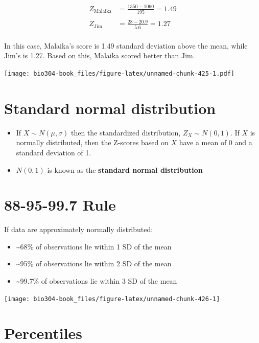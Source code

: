 \documentclass[]{book}
\providecommand{\tightlist}{%
  \setlength{\itemsep}{0pt}\setlength{\parskip}{0pt}}
\theoremstyle{definition}
\theoremstyle{definition}
\theoremstyle{definition}
\theoremstyle{remark}
\begin{document}
\begin{align}
Z_\text{Malaika} &= \frac{1350 - 1060}{195} = 1.49\\
\\
Z_\text{Jim} &= \frac{28 - 20.9}{5.6} = 1.27\\
\end{align}

In this case, Malaika's score is 1.49 standard deviation above the mean,
while Jim's is 1.27. Based on this, Malaika scored better than Jim.

\texttt{[image: bio304-book\_files/figure-latex/unnamed-chunk-425-1.pdf]}

\hypertarget{standard-normal-distribution}{%
\section{Standard normal
distribution}\label{standard-normal-distribution}}

\begin{itemize}
\item
  If \(X \sim N(\mu,\sigma)\) then the standardized distribution,
  \(Z_X \sim N(0,1)\). If \(X\) is normally distributed, then the
  Z-scores based on \(X\) have a mean of 0 and a standard deviation of
  1.
\item
  \(N(0,1)\) is known as the \textbf{standard normal distribution}
\end{itemize}

\hypertarget{rule}{%
\section{88-95-99.7 Rule}\label{rule}}

If data are approximately normally distributed:

\begin{itemize}
\tightlist
\item
  \textasciitilde{}68\% of observations lie within 1 SD of the mean
\item
  \textasciitilde{}95\% of observations lie within 2 SD of the mean
\item
  \textasciitilde{}99.7\% of observations lie within 3 SD of the mean
\end{itemize}

\begin{center}\texttt{[image: bio304-book\_files/figure-latex/unnamed-chunk-426-1]} \end{center}

\hypertarget{percentiles}{%
\section{Percentiles}\label{percentiles}}
\end{document}
